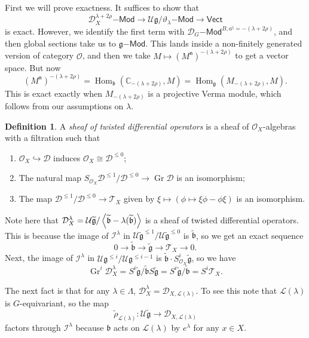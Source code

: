 \documentclass[leqno, openany]{memoir}
\theoremstyle{definition}
\newtheorem{defn}[thm]{Definition}
\theoremstyle{remark}
\theoremstyle{plain}
\theoremstyle{definition}
\theoremstyle{remark}
\newcommand{\C}{\mathbb{C}}
\newcommand{\U}{\mathcal{U}}
\newcommand{\g}{\mathfrak{g}}
\newcommand{\mc}[1]{\mathcal{#1}}
\newcommand{\mf}[1]{\mathfrak{#1}}
\newcommand{\on}[1]{\operatorname{#1}}
\newcommand{\ms}[1]{\mathsf{#1}}
\newcommand{\wt}[1]{\widetilde{#1}}
\DeclareMathOperator{\Hom}{Hom}
\begin{document}
First we will prove exactness. It suffices to show that
\[ \mc{D}_X^{\lambda + 2\rho}\ms{-Mod} \to \U \g / \vartheta_{\lambda} \ms{-Mod} \to \ms{Vect} \]
is exact. However, we identify the first term with $\mc{D}_G\ms{-Mod}^{B, a^{\natural} = -(\lambda+2\rho)}$, and then global sections take us to $\g\ms{-Mod}$. This lands inside a non-finitely generated version of category $\mc{O}$, and then we take $M \mapsto (M^{\mf{n}})^{-(\lambda + 2\rho)}$ to get a vector space. But now
\[ (M^{\mf{n}})^{-(\lambda + 2\rho)} = \Hom_{\mf{b}} (\C_{-(\lambda + 2\rho)}, M) = \Hom_{\g}(M_{-(\lambda +2\rho)}, M). \]
This is exact exactly when $M_{-(\lambda + 2\rho)}$ is a projective Verma module, which follows from our assumptions on $\lambda$.

\begin{defn}
    A \textit{sheaf of twisted differential operators} is a sheaf of $\mc{O}_X$-algebras with a filtration such that
    \begin{enumerate}
        \item $\mc{O}_X \hookrightarrow \mc{D}$ induces $\mc{O}_X \cong \mc{D}^{\leq 0}$;
        \item The natural map $S_{\mc{O}_X} \mc{D}^{\leq 1} / \mc{D}^{\leq 0} \to \on{Gr} \mc{D}$ is an isomorphism;
        \item The map $\mc{D}^{\leq 1} / \mc{D}^{\leq 0} \to \mc{T}_X$ given by $\xi \mapsto (\phi \mapsto \xi \phi - \phi \xi)$ is an isomorphism.
    \end{enumerate}
\end{defn}

Note here that $\mc{D}_X^{\lambda} = \U \wt{\g} / \ev{\wt{\mf{b}} - \lambda(\wt{\mf{b}})}$ is a sheaf of twisted differential operators. This is because the image of $\mc{I}^{\lambda}$ in $\U \wt{\g}^{\leq 1} / \U \wt{\g}^{\leq 0}$ is $\wt{\mf{b}}$, so we get an exact sequence
\[ 0 \to \wt{\mf{b}} \to \wt{\g} \to \mc{T}_X \to 0. \]
Next, the image of $\mc{I}^{\lambda}$ in $\U \g^{\leq i} / \U \g^{\leq i-1}$ is $\wt{\mf{b}} \cdot S^i_{\mc{O}_X} \wt{\g}$, so we have
\[ \on{Gr}^i \mc{D}_X^{\lambda} = S^i \wt{\g} / \wt{\mf{b}} S \wt{\g} = S^i \wt{\g} / \wt{\mf{b}} = S^i \mc{T}_X. \]

The next fact is that for any $\lambda \in \Lambda$, $\mc{D}_X^{\lambda} = \mc{D}_{X, \mc{L}(\lambda)}$. To see this note that $\mc{L}(\lambda)$ is $G$-equivariant, so the map
\[ \wt{\rho}_{\mc{L}(\lambda)} \colon \U \wt{\g} \to \mc{D}_{X, \mc{L}(\lambda)} \]
factors through $\mc{I}^{\lambda}$ because $\mf{b}$ acts on $\mc{L}(\lambda)$ by $e^{\lambda}$ for any $x \in X$.
\end{document}
